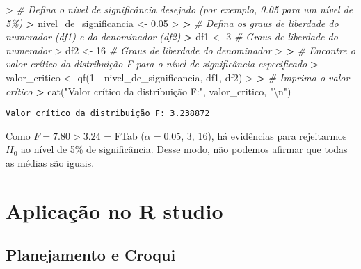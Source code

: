 \documentclass[
]{book}
\newenvironment{Shaded}{\begin{snugshade}}{\end{snugshade}}
\newcommand{\CommentTok}[1]{\textcolor[rgb]{0.56,0.35,0.01}{\textit{#1}}}
\newcommand{\DecValTok}[1]{\textcolor[rgb]{0.00,0.00,0.81}{#1}}
\newcommand{\ErrorTok}[1]{\textcolor[rgb]{0.64,0.00,0.00}{\textbf{#1}}}
\newcommand{\FloatTok}[1]{\textcolor[rgb]{0.00,0.00,0.81}{#1}}
\newcommand{\FunctionTok}[1]{\textcolor[rgb]{0.00,0.00,0.00}{#1}}
\newcommand{\NormalTok}[1]{#1}
\newcommand{\OtherTok}[1]{\textcolor[rgb]{0.56,0.35,0.01}{#1}}
\newcommand{\SpecialCharTok}[1]{\textcolor[rgb]{0.00,0.00,0.00}{#1}}
\newcommand{\StringTok}[1]{\textcolor[rgb]{0.31,0.60,0.02}{#1}}
\begin{document}
\begin{Shaded}
\begin{Highlighting}[]
\SpecialCharTok{\textgreater{}} \CommentTok{\# Defina o nível de significância desejado (por exemplo, 0.05 para um nível de 5\%)}
\ErrorTok{\textgreater{}}\NormalTok{ nivel\_de\_significancia }\OtherTok{\textless{}{-}} \FloatTok{0.05}
\SpecialCharTok{\textgreater{}} 
\ErrorTok{\textgreater{}} \CommentTok{\# Defina os graus de liberdade do numerador (df1) e do denominador (df2)}
\ErrorTok{\textgreater{}}\NormalTok{ df1 }\OtherTok{\textless{}{-}} \DecValTok{3}  \CommentTok{\# Graus de liberdade do numerador}
\SpecialCharTok{\textgreater{}}\NormalTok{ df2 }\OtherTok{\textless{}{-}} \DecValTok{16} \CommentTok{\# Graus de liberdade do denominador}
\SpecialCharTok{\textgreater{}} 
\ErrorTok{\textgreater{}} \CommentTok{\# Encontre o valor crítico da distribuição F para o nível de significância especificado}
\ErrorTok{\textgreater{}}\NormalTok{ valor\_critico }\OtherTok{\textless{}{-}} \FunctionTok{qf}\NormalTok{(}\DecValTok{1} \SpecialCharTok{{-}}\NormalTok{ nivel\_de\_significancia, df1, df2)}
\SpecialCharTok{\textgreater{}} 
\ErrorTok{\textgreater{}} \CommentTok{\# Imprima o valor crítico}
\ErrorTok{\textgreater{}} \FunctionTok{cat}\NormalTok{(}\StringTok{"Valor crítico da distribuição F:"}\NormalTok{, valor\_critico, }\StringTok{"}\SpecialCharTok{\textbackslash{}n}\StringTok{"}\NormalTok{)}
\end{Highlighting}
\end{Shaded}

\begin{verbatim}
Valor crítico da distribuição F: 3.238872 
\end{verbatim}

Como \(F = 7. 80 > 3. 24\) = FTab (\(\alpha = 0. 05\), 3, 16), há evidências para rejeitarmos \(H_0\) ao nível de 5\% de significância. Desse modo, não podemos afirmar que todas as médias são iguais.

\hypertarget{aplicauxe7uxe3o-no-r-studio-2}{%
\section{Aplicação no R studio}\label{aplicauxe7uxe3o-no-r-studio-2}}

\hypertarget{planejamento-e-croqui}{%
\subsection{Planejamento e Croqui}\label{planejamento-e-croqui}}
\end{document}
